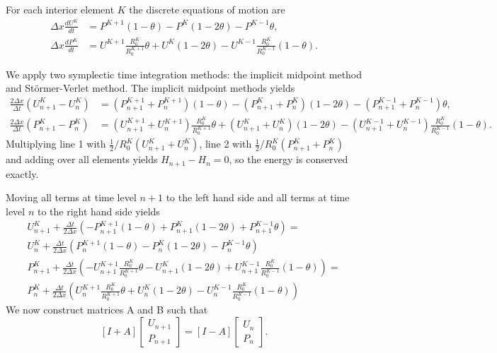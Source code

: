 \documentclass{article}
\begin{document}
For each interior element $K$ the discrete equations of motion are
\begin{equation}
	\begin{aligned}
		\Delta x \frac{d U^K}{d t} &=  P^{K+1} (1-\theta)- P^K (1-2\theta) - P^{K-1}\theta, \\
		\Delta x \frac{d P^K}{d t} &= U^{K+1} \frac{R_0^K}{R_0^{K+1}} \theta + U^K (1-2\theta) - U^{K-1} \frac{R_0^K}{R_0^{K-1}}(1-\theta).
	\end{aligned}
\end{equation}

We apply two symplectic time integration methods: the implicit midpoint method and St\"{o}rmer-Verlet method. The implicit midpoint methods yields
\begin{equation}
	\begin{aligned}
		\frac{2 \Delta x}{\Delta t} \left(U^K_{n+1}-U^K_n\right) &= \left(P_{n+1}^{K+1}+P_n^{K+1}\right) (1-\theta)- \left(P_{n+1}^K+P_n^K\right) (1-2\theta) - \left(P_{n+1}^{K-1}+P_n^{K-1}\right) \theta, \\
		\frac{2 \Delta x}{\Delta t} \left(P^K_{n+1}-P^K_n\right) &= \left(U_{n+1}^{K+1}+U_n^{K+1}\right) \frac{R_0^K}{R_0^{K+1}} \theta + \left(U_{n+1}^K + U_n^K\right) (1-2\theta) - \left(U_{n+1}^{K-1}+U_n^{K-1}\right) \frac{R_0^K}{R_0^{K-1}}(1-\theta).
	\end{aligned}
\end{equation}
Multiplying line 1 with $\frac{1}{2}/R_0^K (U^K_{n+1}+U^K_n)$, line 2 with 
$\frac{1}{2}/R_0^K (P^K_{n+1}+P^K_n)$ and adding over all elements yields $H_{n+1} - H_n = 0$, so the energy is conserved exactly.

Moving all terms at time level $n+1$ to the left hand side and all terms at time level $n$ to the right hand side yields
\begin{equation}
	\begin{aligned}
		U_{n+1}^K + \frac{\Delta t}{2 \Delta x} \left(-P_{n+1}^{K+1} (1-\theta) + P_{n+1}^K (1-2\theta) + P_{n+1}^{K-1} \theta \right) = \\
		U_n^K + \frac{\Delta t}{2 \Delta x} \left(P_{n}^{K+1} (1-\theta) - P_{n}^K (1-2\theta) - P_{n}^{K-1} \theta \right) \\
		P_{n+1}^K + \frac{\Delta t}{2 \Delta x} \left(-U_{n+1}^{K+1} \frac{R_0^K}{R_0^{K+1}} \theta - U_{n+1}^K (1-2\theta) + U_{n+1}^{K-1} \frac{R_0^K}{R_0^{K-1}}(1-\theta) \right) = \\
		P_{n}^K + \frac{\Delta t}{2 \Delta x} \left(U_{n}^{K+1} \frac{R_0^K}{R_0^{K+1}} \theta + U_{n}^K (1-2\theta) - U_{n}^{K-1} \frac{R_0^K}{R_0^{K-1}}(1-\theta) \right)
	\end{aligned}
\end{equation}
We now construct matrices A and B such that
\begin{equation}
	\left[I+A\right] \left[ \begin{array}{c} U_{n+1} \\ P_{n+1} \end{array} \right] = \left[I-A\right]  \left[ \begin{array}{c} U_{n} \\ P_{n} \end{array} \right].
\end{equation}
\end{document}
